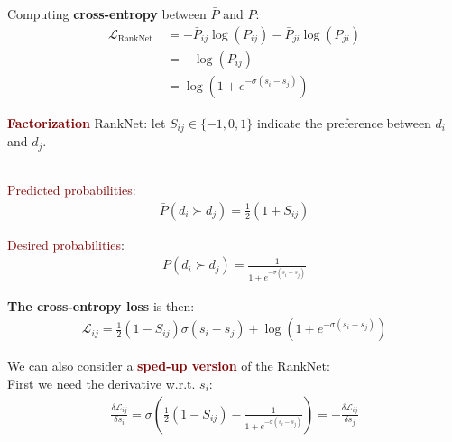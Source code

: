 \vspace{0.5cm}

Computing \textbf{cross-entropy} between $\bar{P}$ and $P$:
\begin{equation*}
\begin{aligned}
\mathcal{L}_{\text {RankNet }} &=-\bar{P}_{i j} \log \left(P_{i j}\right)-\bar{P}_{j i} \log \left(P_{j i}\right) \\
&=-\log \left(P_{i j}\right) \\
&=\log \left(1+e^{-\sigma\left(s_{i}-s_{j}\right)}\right)
\end{aligned}
\end{equation*}

\textbf{\textcolor{Maroon}{Factorization}} \textcolor{NavyBlue}{RankNet}: let $S_{ij} \in \{-1, 0, 1\}$ indicate the preference between $d_i$ and $d_j$. \\
\\
\begin{minipage}{0.5\textwidth}
\textcolor{Maroon}{Predicted probabilities}:
\begin{align*}
    \bar{P}\left(d_{i} \succ d_{j}\right)=\frac{1}{2}\left(1+S_{i j}\right)
\end{align*}
\end{minipage}
\begin{minipage}{0.5\textwidth}
\textcolor{Maroon}{Desired probabilities}:
\begin{align*}
    P\left(d_{i} \succ d_{j}\right)=\frac{1}{1+e^{-\sigma\left(s_{i}-s_{j}\right)}}
\end{align*}
\end{minipage}

\vspace{0.25cm}

\textbf{The cross-entropy loss} is then:
\begin{align*}
    \mathcal{L}_{i j}=\frac{1}{2}\left(1-S_{i j}\right) \sigma\left(s_{i}-s_{j}\right)+\log \left(1+e^{-\sigma\left(s_{i}-s_{j}\right)}\right)
\end{align*}

\newpage

We can also consider a \textbf{\textcolor{Maroon}{sped-up version}} of the \textcolor{NavyBlue}{RankNet}: \\
First we need the derivative w.r.t. $s_i$: 
\begin{align*}
    \frac{\delta \mathcal{L}_{i j}}{\delta s_{i}}=\sigma\left(\frac{1}{2}\left(1-S_{i j}\right)-\frac{1}{1+e^{-\sigma\left(s_{i}-s_{j}\right)}}\right)=-\frac{\delta \mathcal{L}_{i j}}{\delta s_{j}}
\end{align*}

